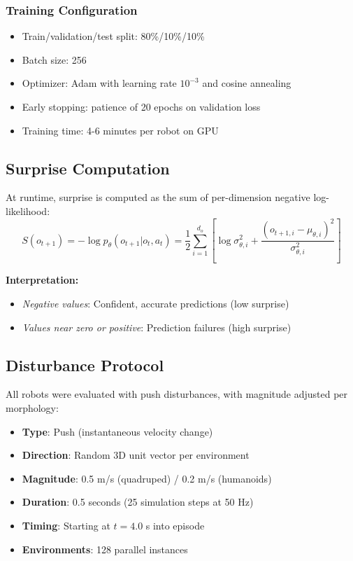 \documentclass[11pt,a4paper]{article}
\begin{document}
\subsubsection{Training Configuration}

\begin{itemize}
    \item Train/validation/test split: 80\%/10\%/10\%
    \item Batch size: 256
    \item Optimizer: Adam with learning rate $10^{-3}$ and cosine annealing
    \item Early stopping: patience of 20 epochs on validation loss
    \item Training time: 4-6 minutes per robot on GPU
\end{itemize}

\subsection{Surprise Computation}

At runtime, surprise is computed as the sum of per-dimension negative log-likelihood:
\begin{equation}
    S(o_{t+1}) = -\log p_\theta(o_{t+1} | o_t, a_t) = \frac{1}{2} \sum_{i=1}^{d_o} \left[ \log \sigma_{\theta,i}^2 + \frac{(o_{t+1,i} - \mu_{\theta,i})^2}{\sigma_{\theta,i}^2} \right]
\end{equation}

\textbf{Interpretation:}
\begin{itemize}
    \item \textit{Negative values}: Confident, accurate predictions (low surprise)
    \item \textit{Values near zero or positive}: Prediction failures (high surprise)
\end{itemize}

\subsection{Disturbance Protocol}

All robots were evaluated with push disturbances, with magnitude adjusted per morphology:
\begin{itemize}
    \item \textbf{Type}: Push (instantaneous velocity change)
    \item \textbf{Direction}: Random 3D unit vector per environment
    \item \textbf{Magnitude}: 0.5 m/s (quadruped) / 0.2 m/s (humanoids)
    \item \textbf{Duration}: 0.5 seconds (25 simulation steps at 50 Hz)
    \item \textbf{Timing}: Starting at $t = 4.0$ s into episode
    \item \textbf{Environments}: 128 parallel instances
\end{itemize}
\end{document}
